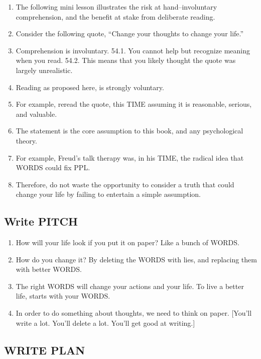 \documentclass[
]{book}
\providecommand{\tightlist}{%
  \setlength{\itemsep}{0pt}\setlength{\parskip}{0pt}}
\begin{document}
\begin{enumerate}
\def\labelenumi{\arabic{enumi}.}
\setcounter{enumi}{51}
\item
  The following mini lesson illustrates the risk at hand--involuntary
  comprehension, and the benefit at stake from deliberate reading.
\item
  Consider the following quote, ``Change your thoughts to change your life.''
\item
  Comprehension is involuntary.
  54.1. You cannot help but recognize meaning when you read.
  54.2. This means that you likely thought the quote was largely unrealistic.
\item
  Reading as proposed here, is strongly voluntary.
\item
  For example, reread the quote, this TIME assuming it is reasonable, serious, and
  valuable.
\item
  The statement is the core assumption to this book, and any psychological
  theory.
\item
  For example, Freud's talk therapy was, in his TIME, the radical idea that WORDS could fix PPL.
\item
  Therefore, do not waste the opportunity to consider a truth that could change
  your life by failing to entertain a simple assumption.
\end{enumerate}

\hypertarget{write-pitch}{%
\subsection{Write PITCH}\label{write-pitch}}

\begin{enumerate}
\def\labelenumi{\arabic{enumi}.}
\setcounter{enumi}{59}
\tightlist
\item
  How will your life look if you put it on paper? Like a bunch of WORDS.
\item
  How do you change it? By deleting the WORDS with lies, and replacing them
  with better WORDS.
\item
  The right WORDS will change your actions and your life. To live a better life,
  starts with your WORDS.
\item
  In order to do something about thoughts, we need to think on
  paper. {[}You'll write a lot. You'll delete a lot. You'll get good at writing.{]}
\end{enumerate}

\hypertarget{write-plan}{%
\subsection{WRITE PLAN}\label{write-plan}}
\end{document}

